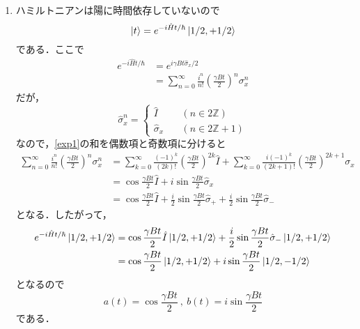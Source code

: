 \documentclass[a4paper,pdflatex,ja=standard]{bxjsarticle}
\begin{document}
\begin{enumerate}
  \item 
  ハミルトニアンは陽に時間依存していないので
  \begin{equation}
    \ket{t}
    =
    e^{-i\hat{H}t/\hbar}\ket{1/2,+1/2}
  \end{equation}
  である．ここで
  \begin{align}
    e^{-i\hat{H}t/\hbar}
    &=
    e^{i\gamma Bt\hat{\sigma}_{x}/2}
    \nonumber
    \\
    &=
    \sum_{n=0}^{\infty}
    \frac{i^{n}}{n!}\left( \frac{\gamma Bt}{2} \right)^{n}\sigma_{x}^n
    \label{exp1}
  \end{align}
  だが，
  \begin{equation}
    \hat{\sigma}_{x}^{n}
    =
    \left\{
      \begin{alignedat}{1}
        \hat{I} \quad & (n\in 2\mathbb{Z}) \\
        \hat{\sigma}_{x} \quad & (n\in 2\mathbb{Z}+1) 
      \end{alignedat}
    \right.
  \end{equation}
  なので，\eqref{exp1}の和を偶数項と奇数項に分けると
  \begin{align}
    \sum_{n=0}^{\infty}
    \frac{i^{n}}{n!}\left( \frac{\gamma Bt}{2} \right)^{n}\sigma_{x}^n
    &=
    \sum_{k=0}^{\infty}
    \frac{(-1)^{k}}{(2k)!}\left( \frac{\gamma Bt}{2} \right)^{2k}\hat{I}
    +
    \sum_{k=0}^{\infty}
    \frac{i(-1)^{k}}{(2k+1)!}\left( \frac{\gamma Bt}{2} \right)^{2k+1}\sigma_{x}
    \nonumber
    \\
    &=
    \cos\frac{\gamma Bt}{2} \hat{I}
    +
    i\sin\frac{\gamma Bt}{2} \hat{\sigma}_{x}
    \nonumber
    \\
    &=
    \cos\frac{\gamma Bt}{2} \hat{I}
    +
    \frac{i}{2}\sin\frac{\gamma Bt}{2} \hat{\sigma}_{+}
    +
    \frac{i}{2}\sin\frac{\gamma Bt}{2} \hat{\sigma}_{-}
  \end{align}
  となる．したがって，
  \begin{align}
    e^{-i\hat{H}t/\hbar}\ket{1/2,+1/2}
    &=
    \cos\frac{\gamma Bt}{2} \hat{I}\ket{1/2,+1/2}
    +
    \frac{i}{2}\sin\frac{\gamma Bt}{2} \hat{\sigma}_{-}\ket{1/2,+1/2}
    \nonumber
    \\
    &=
    \cos\frac{\gamma Bt}{2}\ket{1/2,+1/2}
    +
    i\sin\frac{\gamma Bt}{2}\ket{1/2,-1/2}
  \end{align}
  となるので
  \begin{equation}
    a(t)
    =
    \cos\frac{\gamma Bt}{2}
    \ ,\ 
    b(t)
    =
    i\sin\frac{\gamma Bt}{2}
  \end{equation}
  である．


\end{enumerate}
\end{document}
